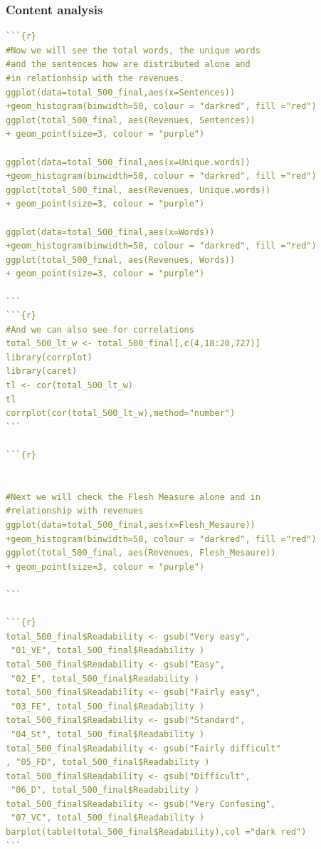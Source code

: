 \documentclass{book}
\begin{document}
\subsubsection{Content analysis}\label{r: van: cont}
\begin{lstlisting}[language=R] 
```{r}
#Now we will see the total words, the unique words 
#and the sentences how are distributed alone and 
#in relationhsip with the revenues.
ggplot(data=total_500_final,aes(x=Sentences))
+geom_histogram(binwidth=50, colour = "darkred", fill ="red")
ggplot(total_500_final, aes(Revenues, Sentences)) 
+ geom_point(size=3, colour = "purple")

ggplot(data=total_500_final,aes(x=Unique.words))
+geom_histogram(binwidth=50, colour = "darkred", fill ="red")
ggplot(total_500_final, aes(Revenues, Unique.words)) 
+ geom_point(size=3, colour = "purple")

ggplot(data=total_500_final,aes(x=Words))
+geom_histogram(binwidth=50, colour = "darkred", fill ="red")
ggplot(total_500_final, aes(Revenues, Words)) 
+ geom_point(size=3, colour = "purple")

```
```{r}
#And we can also see for correlations
total_500_lt_w <- total_500_final[,c(4,18:20,727)]
library(corrplot)
library(caret)
tl <- cor(total_500_lt_w)
tl
corrplot(cor(total_500_lt_w),method="number")
```

```{r}


#Next we will check the Flesh Measure alone and in 
#relationship with revenues
ggplot(data=total_500_final,aes(x=Flesh_Mesaure))
+geom_histogram(binwidth=50, colour = "darkred", fill ="red")
ggplot(total_500_final, aes(Revenues, Flesh_Mesaure)) 
+ geom_point(size=3, colour = "purple")

```

```{r}
total_500_final$Readability <- gsub("Very easy",
 "01_VE", total_500_final$Readability )
total_500_final$Readability <- gsub("Easy",
 "02_E", total_500_final$Readability )
total_500_final$Readability <- gsub("Fairly easy",
 "03_FE", total_500_final$Readability )
total_500_final$Readability <- gsub("Standard",
 "04_St", total_500_final$Readability )
total_500_final$Readability <- gsub("Fairly difficult"
, "05_FD", total_500_final$Readability )
total_500_final$Readability <- gsub("Difficult",
 "06_D", total_500_final$Readability )
total_500_final$Readability <- gsub("Very Confusing",
 "07_VC", total_500_final$Readability )
barplot(table(total_500_final$Readability),col ="dark red")
```


\end{lstlisting}
\end{document}

